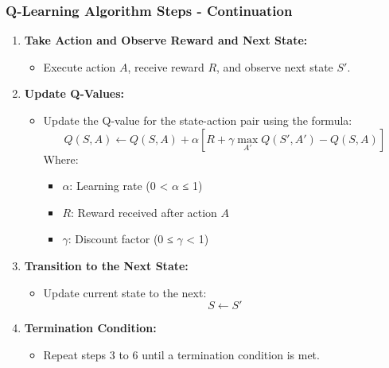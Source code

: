 \documentclass[aspectratio=169]{beamer}
\begin{document}
\begin{frame}[fragile]
    \frametitle{Q-Learning Algorithm Steps - Continuation}
    \begin{enumerate}[resume]
        \item \textbf{Take Action and Observe Reward and Next State:}
        \begin{itemize}
            \item Execute action \(A\), receive reward \(R\), and observe next state \(S'\).
        \end{itemize}

        \item \textbf{Update Q-Values:}
        \begin{itemize}
            \item Update the Q-value for the state-action pair using the formula:
            \begin{equation}
                Q(S, A) \leftarrow Q(S, A) + \alpha \left[R + \gamma \max_{A'} Q(S', A') - Q(S, A)\right]
            \end{equation}
            Where:
            \begin{itemize}
                \item \( \alpha \): Learning rate (0 < $\alpha$ ≤ 1)
                \item \( R \): Reward received after action \(A\)
                \item \( \gamma \): Discount factor (0 ≤ $\gamma$ < 1)
            \end{itemize}
        \end{itemize}

        \item \textbf{Transition to the Next State:}
        \begin{itemize}
            \item Update current state to the next:
            \begin{equation}
                S \leftarrow S'
            \end{equation}
        \end{itemize}

        \item \textbf{Termination Condition:}
        \begin{itemize}
            \item Repeat steps 3 to 6 until a termination condition is met.
        \end{itemize}
    \end{enumerate}
\end{frame}
\end{document}
